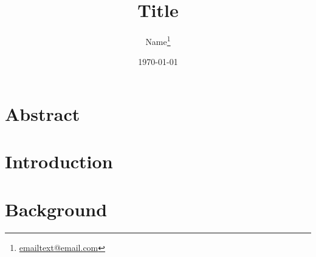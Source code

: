\documentclass[12pt,a4paper,twoside]{report}
\begin{document}
	
\listoftodos

	\title{Title}
	

	\author{Name\footnote{\href{mailto:email@email.com}{emailtext@email.com}}}
	
	
	

	\date{\today}


	
\pagestyle{fancy}
\fancyhf{}
\fancyhead[RE,LO]{\leftmark}%
\fancyhead[LE,RO]{\thepage}
\renewcommand{\chaptermark}[1]{\markboth{\chaptername\ \thechapter\ #1}{}}



\maketitle

\thispagestyle{empty}

\chapter*{\centering Abstract}



\thispagestyle{empty}
\chapterEnd %

	
\glsunsetall
	
\tableofcontents
\chapterEnd
	
\listoffigures
\chapterEnd

\printnoidxglossaries %
\chapterEnd

\glsresetall


\chapter{Introduction\label{sc:Intro}}  

\chapterEnd

\chapter{Background\label{sc:Background}}

\chapterEnd




\chapterEnd


	
\end{document}
